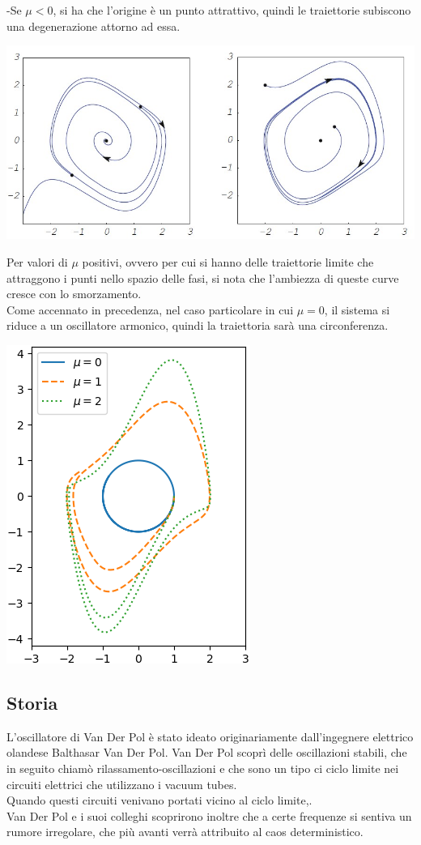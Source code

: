 \documentclass[12pt]{article}
\begin{document}
-Se $\mu<0$, si ha che l'origine è un punto attrattivo, quindi le traiettorie subiscono una degenerazione attorno ad essa. \\
\begin{center}
	\includegraphics[scale=0.7]{Traiettorie}
\end{center}
Per valori di $\mu$ positivi, ovvero per cui si hanno delle traiettorie limite che attraggono i punti nello spazio delle fasi, si nota che l'ambiezza di queste curve cresce con lo smorzamento. \\
Come accennato in precedenza, nel caso particolare in cui $\mu = 0$, il sistema si riduce a un oscillatore armonico, quindi la traiettoria sarà una circonferenza.
\begin{center}
	\includegraphics[scale=1]{Vari smorzamenti} 
\end{center}
\subsection{Storia}
L'oscillatore di Van Der Pol è stato ideato originariamente dall'ingegnere elettrico olandese Balthasar Van Der Pol. Van Der Pol scoprì delle oscillazioni stabili, che in seguito chiamò rilassamento-oscillazioni e che sono un tipo ci ciclo limite nei circuiti elettrici che utilizzano i vacuum tubes. \\
Quando questi circuiti venivano portati vicino al ciclo limite,. \\
Van Der Pol e i suoi colleghi scoprirono inoltre che a certe frequenze si sentiva un rumore irregolare, che più avanti verrà attribuito al caos deterministico. 
\end{document}
